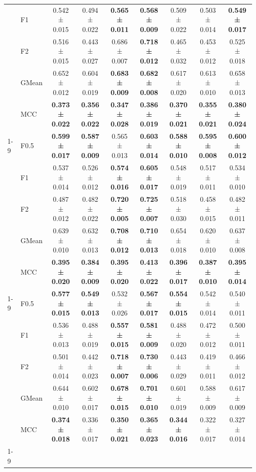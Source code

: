 \begin{table}[H]
{\begin{tabular}{llccccccc}
 & F1 & 0.542 ± 0.015 & 0.494 ± 0.022 & \textbf{0.565 ± 0.011} & \textbf{0.568 ± 0.009} & 0.509 ± 0.022 & 0.503 ± 0.014 & \textbf{0.549 ± 0.017} \\
 & F2 & 0.516 ± 0.015 & 0.443 ± 0.027 & 0.686 ± 0.007 & \textbf{0.718 ± 0.012} & 0.465 ± 0.032 & 0.453 ± 0.012 & 0.525 ± 0.018 \\
 & GMean & 0.652 ± 0.012 & 0.604 ± 0.019 & \textbf{0.683 ± 0.009} & \textbf{0.682 ± 0.008} & 0.617 ± 0.020 & 0.613 ± 0.010 & 0.658 ± 0.013 \\
 & MCC & \textbf{0.373 ± 0.022} & \textbf{0.356 ± 0.022} & \textbf{0.347 ± 0.028} & \textbf{0.386 ± 0.019} & \textbf{0.370 ± 0.021} & \textbf{0.355 ± 0.021} & \textbf{0.380 ± 0.024} \\
\cline{1-9}
\multirow[t]{5}{*}{TabPFN} & F0.5 & \textbf{0.599 ± 0.017} & \textbf{0.587 ± 0.009} & 0.565 ± 0.013 & \textbf{0.603 ± 0.014} & \textbf{0.588 ± 0.010} & \textbf{0.595 ± 0.008} & \textbf{0.600 ± 0.012} \\
 & F1 & 0.537 ± 0.014 & 0.526 ± 0.012 & \textbf{0.574 ± 0.016} & \textbf{0.605 ± 0.017} & 0.548 ± 0.019 & 0.517 ± 0.011 & 0.534 ± 0.010 \\
 & F2 & 0.487 ± 0.012 & 0.482 ± 0.022 & \textbf{0.720 ± 0.005} & \textbf{0.725 ± 0.007} & 0.518 ± 0.030 & 0.458 ± 0.015 & 0.482 ± 0.011 \\
 & GMean & 0.639 ± 0.010 & 0.632 ± 0.013 & \textbf{0.708 ± 0.012} & \textbf{0.710 ± 0.013} & 0.654 ± 0.018 & 0.620 ± 0.010 & 0.637 ± 0.008 \\
 & MCC & \textbf{0.395 ± 0.020} & \textbf{0.384 ± 0.009} & \textbf{0.395 ± 0.020} & \textbf{0.413 ± 0.022} & \textbf{0.396 ± 0.017} & \textbf{0.387 ± 0.010} & \textbf{0.395 ± 0.014} \\
\cline{1-9}
\multirow[t]{5}{*}{XGBoost} & F0.5 & \textbf{0.577 ± 0.015} & \textbf{0.549 ± 0.013} & 0.532 ± 0.026 & \textbf{0.567 ± 0.017} & \textbf{0.554 ± 0.015} & 0.542 ± 0.014 & 0.540 ± 0.011 \\
 & F1 & 0.536 ± 0.013 & 0.488 ± 0.019 & \textbf{0.557 ± 0.015} & \textbf{0.581 ± 0.009} & 0.488 ± 0.020 & 0.472 ± 0.012 & 0.500 ± 0.011 \\
 & F2 & 0.501 ± 0.014 & 0.442 ± 0.023 & \textbf{0.718 ± 0.007} & \textbf{0.730 ± 0.006} & 0.443 ± 0.029 & 0.419 ± 0.011 & 0.466 ± 0.012 \\
 & GMean & 0.644 ± 0.010 & 0.602 ± 0.017 & \textbf{0.678 ± 0.015} & \textbf{0.701 ± 0.010} & 0.601 ± 0.019 & 0.588 ± 0.009 & 0.617 ± 0.009 \\
 & MCC & \textbf{0.374 ± 0.018} & 0.336 ± 0.017 & \textbf{0.350 ± 0.021} & \textbf{0.365 ± 0.023} & \textbf{0.344 ± 0.016} & 0.322 ± 0.017 & 0.327 ± 0.014 \\
\cline{1-9}
\bottomrule
\end{tabular}
    }
\end{table}
